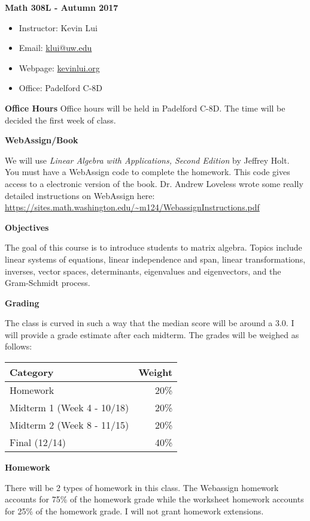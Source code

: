 \documentclass{article}
\begin{document}
\textbf{\huge  Math 308L - Autumn 2017 }
\begin{itemize}
    \item
        Instructor: Kevin Lui
    \item
        Email: \href{mailto:klui@uw.edu}{klui@uw.edu}
    \item
        Webpage: \url{kevinlui.org}
    \item
        Office: Padelford C-8D
\end{itemize}

\textbf{Office Hours}
Office hours will be held in Padelford C-8D. The time will be decided the first
week of class.

\textbf{WebAssign/Book}

We will use \textit{Linear Algebra with Applications, Second Edition} by
Jeffrey Holt. You must have a WebAssign code to complete the homework. This
code gives access to a electronic version of the book. Dr. Andrew Loveless
wrote some really detailed instructions on WebAssign here:
\url{https://sites.math.washington.edu/~m124/WebassignInstructions.pdf}

\textbf{Objectives}

The goal of this course is to introduce students to matrix algebra. Topics
include linear systems of equations, linear independence and span, linear
transformations, inverses, vector spaces, determinants, eigenvalues and
eigenvectors, and the Gram-Schmidt process.

\textbf{Grading}

The class is curved in such a way that the median score will be around a 3.0. I
will provide a grade estimate after each midterm.  The grades will be weighed
as follows:

\begin{tabular}{ l r }
    Category  & Weight   \\
    \hline
    Homework  & 20\%      \\
    Midterm 1 (Week 4 - 10/18) & 20\%      \\
    Midterm 2 (Week 8 - 11/15) & 20\%      \\
    Final (12/14)    & 40\%
\end{tabular}

\textbf{Homework}

There will be 2 types of homework in this class. The Webassign homework accounts
for 75\% of the homework grade while the worksheet homework accounts for 25\%
of the homework grade. I will not grant homework extensions.
\end{document}
